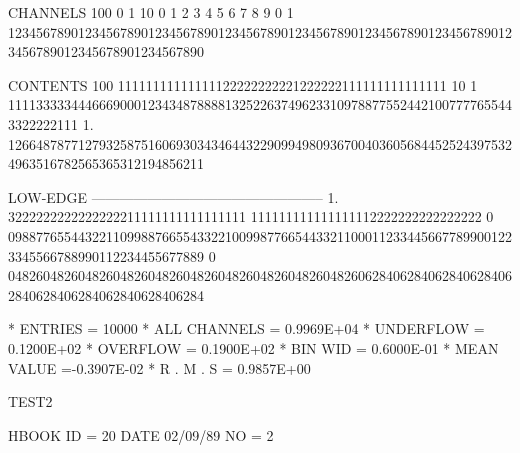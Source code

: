 \begin{Fighere}
\begin{XMPfrac}{3.2}
CHANNELS 100   0                                                                                                  1
          10   0        1         2         3         4         5         6         7         8         9         0
           1   1234567890123456789012345678901234567890123456789012345678901234567890123456789012345678901234567890
 
CONTENTS 100                             11111111111111122222222221222222111111111111111
          10           1 1111333334446669000123434878888132522637496233109788775524421007777655443322222111
           1.  1266487877127932587516069303434644322909949809367004036056844525243975324963516782565365312194856211
 
LOW-EDGE       --------------------------------------------------
           1.  3222222222222222211111111111111111                                 111111111111111112222222222222222
           0   0988776554432211099887665543322100998776654433211000112334456677899001223345566788990112234455677889
           0   0482604826048260482604826048260482604826048260482606284062840628406284062840628406284062840628406284
 
* ENTRIES =      10000      * ALL CHANNELS = 0.9969E+04      * UNDERFLOW = 0.1200E+02      * OVERFLOW = 0.1900E+02
* BIN WID = 0.6000E-01      * MEAN VALUE   =-0.3907E-02      * R . M . S = 0.9857E+00
\end{XMPfrac}
\begin{XMPfont}{6}
TEST2
 
HBOOK     ID = 20        DATE  02/09/89          NO =  2
 

\end{XMPfont}
\end{Fighere}
